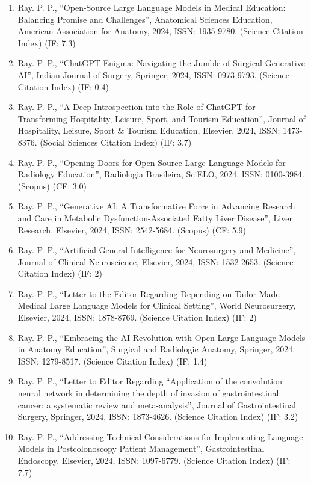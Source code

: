 \documentclass[11pt,a4paper]{moderncv}
\begin{document}
\begin{adjustwidth}{6em}{0pt}
\begin{enumerate}
		\item Ray. P. P., “Open-Source Large Language Models in Medical Education: Balancing Promise and Challenges”, Anatomical Sciences Education, American Association for Anatomy, 2024, ISSN: 1935-9780. (Science Citation Index) (IF: 7.3)
		\item Ray. P. P., “ChatGPT Enigma: Navigating the Jumble of Surgical Generative AI”, Indian Journal of Surgery, Springer, 2024, ISSN: 0973-9793. (Science Citation Index) (IF: 0.4)
		\item Ray. P. P., “A Deep Introspection into the Role of ChatGPT for Transforming Hospitality, Leisure, Sport, and Tourism Education”, Journal of Hospitality, Leisure, Sport \& Tourism Education, Elsevier, 2024, ISSN: 1473-8376. (Social Sciences Citation Index) (IF: 3.7)
		\item Ray. P. P., “Opening Doors for Open-Source Large Language Models for Radiology Education”, Radiologia Brasileira, SciELO, 2024, ISSN: 0100-3984. (Scopus) (CF: 3.0)
		\item Ray. P. P., “Generative AI: A Transformative Force in Advancing Research and Care in Metabolic Dysfunction-Associated Fatty Liver Disease”, Liver Research, Elsevier, 2024, ISSN: 2542-5684. (Scopus) (CF: 5.9)
		\item Ray. P. P., “Artificial General Intelligence for Neurosurgery and Medicine”, Journal of Clinical Neuroscience, Elsevier, 2024, ISSN: 1532-2653. (Science Citation Index) (IF: 2)
		\item Ray. P. P., “Letter to the Editor Regarding Depending on Tailor Made Medical Large Language Models for Clinical Setting”, World Neurosurgery, Elsevier, 2024, ISSN: 1878-8769. (Science Citation Index) (IF: 2)
		\item Ray. P. P., “Embracing the AI Revolution with Open Large Language Models in Anatomy Education”, Surgical and Radiologic Anatomy, Springer, 2024, ISSN: 1279-8517. (Science Citation Index) (IF: 1.4)
		\item Ray. P. P., “Letter to Editor Regarding “Application of the convolution neural network in determining the depth of invasion of gastrointestinal cancer: a systematic review and meta-analysis”, Journal of Gastrointestinal Surgery, Springer, 2024, ISSN: 1873-4626. (Science Citation Index) (IF: 3.2)
		\item Ray. P. P., “Addressing Technical Considerations for Implementing Language Models in Postcolonoscopy Patient Management”, Gastrointestinal Endoscopy, Elsevier, 2024, ISSN: 1097-6779. (Science Citation Index) (IF: 7.7)

\end{enumerate}
\end{adjustwidth}
\end{document}
